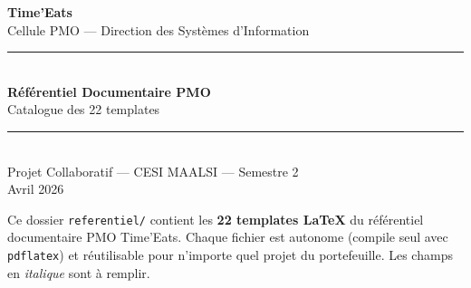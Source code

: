 \documentclass[11pt,a4paper,oneside]{report}
\begin{document}
\small

\begin{titlepage}
  \pagecolor{cnNavy}\color{white}
  \vspace*{3cm}
  \begin{center}
    {\Huge\bfseries Time'Eats}\\[0.5cm]
    {\normalsize\textcolor{cnSlate} Cellule PMO — Direction des Systèmes d'Information}\\[2cm]
    \textcolor{cnOrange}{\rule{12cm}{1.5pt}}\\[1cm]
    {\LARGE\bfseries Référentiel Documentaire PMO}\\[0.5cm]
    {\large Catalogue des 22 templates}\\[1cm]
    \textcolor{cnOrange}{\rule{12cm}{1.5pt}}\\[2cm]
    {\normalsize Projet Collaboratif — CESI MAALSI — Semestre 2}\\[0.3cm]
    {\normalsize Avril 2026}
  \end{center}
\end{titlepage}
\nopagecolor

\begin{finding}
Ce dossier \texttt{referentiel/} contient les \textbf{22 templates LaTeX} du référentiel documentaire PMO Time'Eats. Chaque fichier est autonome (compile seul avec \texttt{pdflatex}) et réutilisable pour n'importe quel projet du portefeuille. Les champs en \textit{italique} sont à remplir.
\end{finding}

\vspace{6pt}
\end{document}
